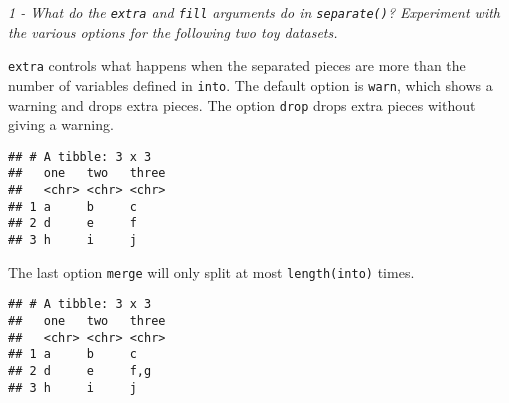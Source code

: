 \documentclass[]{article}
\newenvironment{Shaded}{\begin{snugshade}}{\end{snugshade}}
\newcommand{\KeywordTok}[1]{\textcolor[rgb]{0.13,0.29,0.53}{\textbf{#1}}}
\newcommand{\DataTypeTok}[1]{\textcolor[rgb]{0.13,0.29,0.53}{#1}}
\newcommand{\StringTok}[1]{\textcolor[rgb]{0.31,0.60,0.02}{#1}}
\newcommand{\OperatorTok}[1]{\textcolor[rgb]{0.81,0.36,0.00}{\textbf{#1}}}
\newcommand{\NormalTok}[1]{#1}
\theoremstyle{definition}
\theoremstyle{definition}
\theoremstyle{definition}
\theoremstyle{remark}
\begin{document}
\emph{1 - What do the \texttt{extra} and \texttt{fill} arguments do in
\texttt{separate()}? Experiment with the various options for the
following two toy datasets.}

\texttt{extra} controls what happens when the separated pieces are more
than the number of variables defined in \texttt{into}. The default
option is \texttt{warn}, which shows a warning and drops extra pieces.
The option \texttt{drop} drops extra pieces without giving a warning.

\begin{Shaded}
\end{Shaded}

\begin{verbatim}
## # A tibble: 3 x 3
##   one   two   three
##   <chr> <chr> <chr>
## 1 a     b     c    
## 2 d     e     f    
## 3 h     i     j
\end{verbatim}

The last option \texttt{merge} will only split at most
\texttt{length(into)} times.

\begin{Shaded}
\end{Shaded}

\begin{verbatim}
## # A tibble: 3 x 3
##   one   two   three
##   <chr> <chr> <chr>
## 1 a     b     c    
## 2 d     e     f,g  
## 3 h     i     j
\end{verbatim}
\end{document}
